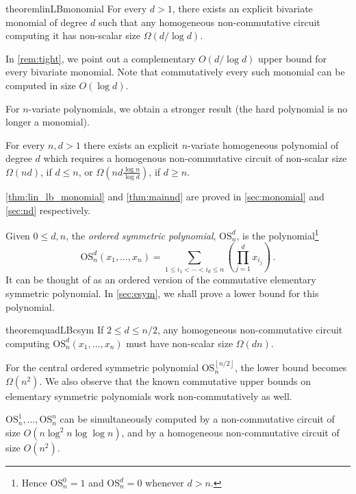 \documentclass[10pt,a4paper]{article}
\def\floor#1{\left\lfloor #1 \right\rfloor}
\def\inparen#1{\left( #1 \right)}
\newcommand{\esym}[2]{\mathrm{OS}_{#1}^{#2}}
\begin{document}
\begin{restatable}{theorem}{linLBmonomial}\label{thm:lin_lb_monomial}
  For every $d>1$, there exists an explicit bivariate monomial of degree $d$ such that any homogeneous non-commutative circuit computing it has non-scalar size $\Omega(d/\log d)$.
\end{restatable}

\noindent In \autoref{rem:tight}, we point out a complementary $O(d/\log d)$ upper bound for every bivariate monomial. 
Note that commutatively every such monomial can be computed in size $O(\log d)$.

For $n$-variate polynomials, we obtain a stronger result (the hard polynomial is no longer a monomial).   

\begin{theorem}\label{thm:mainnd} For every $n,d>1$ there exists an explicit $n$-variate homogeneous polynomial of degree $d$ which requires a homogenous  non-commutative circuit of non-scalar size $\Omega(nd)$, if $d\leq n$, or $\Omega(nd \frac{\log n}{\log d})$, if $d\geq n$.  
\end{theorem}

\noindent \autoref{thm:lin_lb_monomial} and \autoref{thm:mainnd} are proved in \autoref{sec:monomial} and \autoref{sec:nd} respectively.


Given $0\leq d, n$, the \emph{ordered symmetric polynomial}, $\esym{n}{d}$, is the polynomial\footnote{Hence $\esym{n}{0}=1$ and $\esym{n}{d}=0$ whenever $d>n$.}
\[ 
 \esym{n}{d}(x_1,\dots,x_n) = \sum_{1\leq i_1 < \cdots < i_d \leq n} \inparen{\prod_{j=1}^{d} x_{i_j}}\,.
\]
It can be thought of as an ordered version of the commutative elementary symmetric polynomial. 
In \autoref{sec:esym}, we shall prove a lower bound for this polynomial.


\begin{restatable}{theorem}{quadLBcsym}\label{thm:quad_lb_csym}
  If $2\leq d\leq n/2$, any homogeneous non-commutative circuit computing $\esym{n}{d}(x_1,\dots,x_n)$ must have non-scalar size $\Omega(dn)$.
\end{restatable}


For the central ordered symmetric polynomial $\esym{n}{\floor{n/2}}$, the lower bound becomes $\Omega(n^2)$. 
We also observe that the known commutative upper bounds on elementary symmetric polynomials work non-commutatively as well.

\begin{proposition}\label{prop:ub}
  $\esym{n}{1}, \dots, \esym{n}{n}$ can be simultaneously computed by a non-commutative circuit of size $O(n\log^2n\log\log n)$, and by a homogeneous non-commutative circuit of size $O(n^2)$. 
\end{proposition}
 
\end{document}
